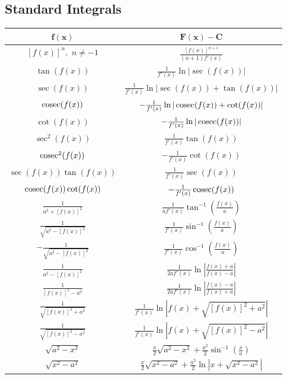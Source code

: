 \documentclass[12pt, a4paper]{article}
\begin{document}
\begin{multicols*}{3}
\subsection{Standard Integrals}
{\centering
\begin{tabular}{|c|c|}
\hline
$\mathbf{f(x)}$ & $\mathbf{F(x) - C}$ \\ \hline
$[f(x)]^n,$ $n\neq -1$ & $\frac{[f(x)]^{n+1}}{(n+1)f'(x)} $\\ \hline
$\tan(f(x))$ & $\frac{1}{f'(x)}\ln|\sec(f(x))| $ \\ \hline
$\sec(f(x))$ & $\frac{1}{f'(x)}\ln|\sec(f(x)) + \tan(f(x))| $ \\ \hline
$\operatorname{cosec}(f(x))$ & $-\frac{1}{f'(x)}\ln|\operatorname{cosec}(f(x)) + \cot(f(x))| $ \\ \hline
$\cot(f(x))$ & $-\frac{1}{f'(x)}\ln|\operatorname{cosec}(f(x))| $ \\ \hline
$\sec^2(f(x))$ & $\frac{1}{f'(x)}\tan(f(x)) $ \\ \hline
$\operatorname{cosec}^2(f(x))$ & $-\frac{1}{f'(x)}\cot(f(x)) $ \\ \hline
$\sec(f(x))\tan(f(x))$ & $\frac{1}{f'(x)}\sec(f(x)) $ \\ \hline
$\operatorname{cosec}(f(x))\cot(f(x))$ & $-\frac{1}{f'(x)}\operatorname{cosec}(f(x)) $ \\ \hline
$\frac{1}{a^2+[f(x)]^2}$ & $\frac{1}{af'(x)}\tan^{-1}(\frac{f(x)}{a})$ \\ \hline
$\frac{1}{\sqrt{a^2-[f(x)]^2}}$ & $\frac{1}{f'(x)}\sin^{-1}(\frac{f(x)}{a})$ \\ \hline
$-\frac{1}{\sqrt{a^2-[f(x)]^2}}$ & $\frac{1}{f'(x)}\cos^{-1}(\frac{f(x)}{a})$ \\ \hline
$\frac{1}{a^2-[f(x)]^2}$ & $\frac{1}{2af'(x)}\ln|\frac{f(x)+a}{f(x)-a}|$ \\ \hline
$\frac{1}{[f(x)]^2-a^2}$ & $\frac{1}{2af'(x)}\ln|\frac{f(x)-a}{f(x)+a}|$ \\ \hline
$\frac{1}{\sqrt{[f(x)]^2+a^2}}$ & $\frac{1}{f'(x)}\ln|f(x)+\sqrt{[f(x)]^2+a^2}|$ \\ \hline
$\frac{1}{\sqrt{[f(x)]^2-a^2}}$ & $\frac{1}{f'(x)}\ln|f(x)+\sqrt{[f(x)]^2-a^2}|$ \\ \hline
$\sqrt{a^2-x^2}$ & $\frac{x}{2}\sqrt{a^2-x^2}+\frac{a^2}{2}\sin^{-1}(\frac{x}{a})$ \\ \hline
$\sqrt{x^2-a^2}$ & $\frac{x}{2}\sqrt{x^2-a^2}+\frac{a^2}{2}\ln|x+\sqrt{x^2-a^2}|$ \\ \hline
\end{tabular}
\par}
\end{multicols*}
\end{document}
